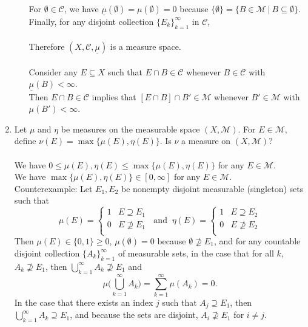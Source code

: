\begin{enumerate}
\begin{enumerate}[label=(\roman*),align=left]
		\\For $\emptyset\in\mathcal{C}$, we have $\underline\mu(\emptyset)=\mu(\emptyset)=0$ because $\{\emptyset\}=\{B\in\mathcal{M}\ |\ B\subseteq\emptyset\}$.
		\\Finally, for any disjoint collection $\{E_k\}_{k=1}^\infty$ in $\mathcal{C}$,\\
		\\Therefore $(X,\mathcal{C},\underline\mu)$ is a measure space.\\
		\\Consider any $E\subseteq X$ such that $E\cap B\in\mathcal{C}$ whenever $B\in\mathcal{C}$ with $\underline\mu(B)<\infty$.
		\\Then $E\cap B\in\mathcal{C}$ implies that $[E\cap B]\cap B'\in\mathcal{M}$ whenever $B'\in\mathcal{M}$ with $\mu(B')<\infty$.
	\end{enumerate}
	\item Let $\mu$ and $\eta$ be measures on the measurable space $(X,\mathcal{M})$.
	For $E\in\mathcal{M}$, define $\nu(E)=\max\{\mu(E),\eta(E)\}$. Is $\nu$ a measure on $(X,\mathcal{M})$?\\
	\\We have $0\le\mu(E),\eta(E)\le\max\{\mu(E),\eta(E)\}$ for any $E\in\mathcal{M}$.
	\\We have $\max\{\mu(E),\eta(E)\}\in[0,\infty]$ for any $E\in\mathcal{M}$.
	\\Counterexample:
	Let $E_1,E_2$ be nonempty disjoint measurable (singleton) sets such that
	\[
		\mu(E)=
		\begin{cases}
			1&E\supseteq E_1\\
			0&E\not\supseteq E_1\\
		\end{cases}
		\ \text{ and }\ \eta(E)=
		\begin{cases}
			1&E\supseteq E_2\\
			0&E\not\supseteq E_2\\
		\end{cases}
	\]
	Then $\mu(E)\in\{0,1\}\ge0$, $\mu(\emptyset)=0$ because $\emptyset\not\supseteq E_1$, and for any countable disjoint collection $\{A_k\}_{k=1}^\infty$ of measurable sets,
	in the case that for all $k$, $A_k\not\supseteq E_1$, then $\bigcup_{k=1}^\infty A_k\not\supseteq E_1$ and 
	\[
		\mu\biggl(\bigcup_{k=1}^\infty A_k\biggr)=\sum_{k=1}^\infty\mu(A_k)=0.
	\]
	In the case that there exists an index $j$ such that $A_j\supseteq E_1$, then $\bigcup_{k=1}^\infty A_k\supseteq E_1$, and because the sets are disjoint, $A_i\not\supseteq E_1$ for $i\neq j$.

\end{enumerate}
